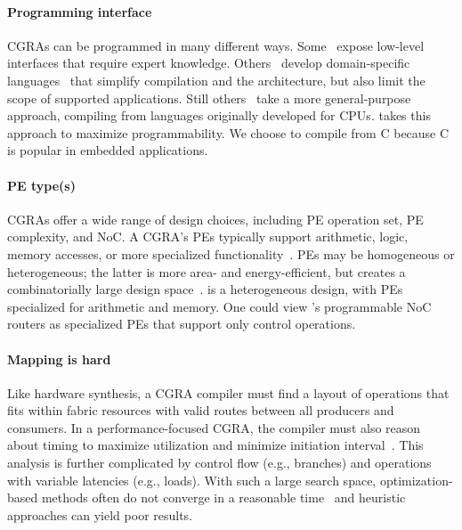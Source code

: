 \paragraph{Programming interface}
CGRAs can be programmed in many different ways.
% 
Some~\cite{snafu,dally:ieee08:elm} expose low-level interfaces that require expert knowledge.
% 
Others~\cite{plasticine} develop domain-specific languages~\cite{sujeeth2014delite} that simplify compilation and the architecture, but also limit the scope of supported applications.
% 
Still others~\cite{swanson2003wavescalar} take a more general-purpose approach,
compiling from languages originally developed for CPUs.
% 
\riptide takes this approach to maximize programmability.
We choose to compile from C because C is popular in embedded applications.

\paragraph{PE type(s)}
CGRAs offer a wide range of design choices, including PE
operation set, PE complexity, and NoC.
%
A CGRA's PEs typically support arithmetic, logic, memory accesses,
%
or more specialized functionality~\cite{snafu,weng2020dsagen,dadu2019towards,q100,gorgon,capstan,polygraph,taskstream}.
%
PEs may be homogeneous or heterogeneous; the latter is more area- and
energy-efficient, but creates a combinatorially large design space~\cite{revamp}.
%
\riptide is a heterogeneous design, with PEs specialized for
arithmetic and memory.
%
One could view \riptide's programmable NoC routers
as specialized PEs that support only control operations.

\paragraph{Mapping is hard}
Like hardware synthesis, a CGRA compiler must find a layout of
operations that fits within fabric resources with valid routes between
all producers and consumers.
%
In a performance-focused CGRA, the compiler must also reason
about timing to maximize utilization and minimize
initiation interval~\cite{pathseeker,chordmap,lee2021ultra,himap,4dcgra,amp2020,ureca,balasubramanian2018laser,pager2015software,hamzeh2012epimap,karunaratne2018dnestmap}.
% 
This analysis is further complicated by control flow (e.g., branches) and operations with variable latencies (e.g., loads).
%
With such a large search space, optimization-based methods often
do not converge in a reasonable time~\cite{hybrid-sched,nowatzki2013general} and heuristic approaches can yield poor results.
% 

